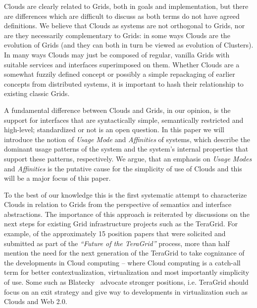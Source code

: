 \documentclass[conference,final]{IEEEtran}
\newcommand{\I}[1]{\textit{#1}}
\begin{document}
 Clouds are clearly related to Grids, both in goals and
 implementation, but there are differences which are difficult to
 discuss as both terms do not have agreed definitions.  We believe
 that Clouds as systems are not orthogonal to Grids, nor are they
 necessarily complementary to Grids: in some ways Clouds are the
 evolution of Grids (and they can both in turn be viewed as evolution
 of Clusters).  In many ways Clouds may just be composed of regular,
 vanilla Grids with suitable services and interfaces superimposed on
 them.  Whether Clouds are a somewhat fuzzily defined concept or
 possibly a simple repackaging of earlier concepts from distributed
 systems, it is important to hash their relationship to existing
 classic Grids.
 
 A fundamental difference between Clouds and Grids, in our opinion, is
 the support for interfaces that are syntactically simple,
 semantically restricted and high-level; standardized or not is an
 open question.  In this paper we will introduce the notion of
 \I{Usage Mode} and \I{Affinities} of systems, which describe the
 dominant usage patterns of the system and the system's internal
 properties that support these patterns, respectively.  We argue, that
 an emphasis on {\it Usage Modes} and {\it Affinities} is the putative
 cause for the simplicity of use of Clouds and this will be a major
 focus of this paper.

 To the best of our knowledge this is the first systematic attempt to
 characterize Clouds in relation to Grids from the perspective of
 semantics and interface abstractions.  The importance of this
 approach is reiterated by discussions on the next steps for existing
 Grid infrastructure projects such as the TeraGrid.  For example, of
 the approximately 15 position papers that were solicited and
 submitted as part of the \I{``Future of the TeraGrid''} process, more
 than half mention the need for the next generation of the TeraGrid to
 take cognizance of the developments in Cloud computing -- where Cloud
 computing is a catch-all term for better contextualization,
 virtualization and most importantly simplicity of use.  Some such as
 Blatecky~\cite{teraGridfuture} advocate stronger positions, i.e.
 TeraGrid should focus on an exit strategy and give way to
 developments in virtualization such as Clouds and Web 2.0.
\end{document}
